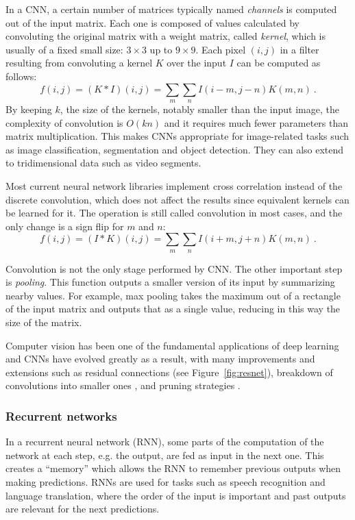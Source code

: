 In a CNN, a certain number of matrices typically named \textit{channels} is computed out of the input matrix. Each one is composed of values calculated by convoluting the original matrix with a weight matrix, called \textit{kernel}, which is usually of a fixed small size: $3\times 3$ up to $9\times 9$. Each pixel $(i, j)$ in a filter resulting from convoluting a kernel $K$ over the input $I$ can be computed as follows:
\begin{equation}
    f(i,j)=\left(K\ast I\right)(i,j)=\sum_{m}\sum_{n}I(i-m,j-n)K(m,n)~.
\end{equation}
By keeping $k$, the size of the kernels, notably smaller than the input image, the complexity of convolution is $O(kn)$ and it requires much fewer parameters than matrix multiplication.  This makes CNNs appropriate for image-related tasks such as image classification, segmentation and object detection. They can also extend to tridimensional data such as video segments.


Most current neural network libraries implement cross correlation instead of the discrete convolution, which does not affect the results since equivalent kernels can be learned for it. The operation is still called convolution in most cases, and the only change is a sign flip for $m$ and $n$:
\begin{equation}
    f(i,j)=\left(I\ast K\right)(i,j)=\sum_{m}\sum_{n}I(i+m,j+n)K(m,n)~.
\end{equation}

Convolution is not the only stage performed by CNN. The other important step is \textit{pooling}. This function outputs a smaller version of its input by summarizing nearby values. For example, max pooling  takes the maximum out of a rectangle of the input matrix and outputs that as a single value, reducing in this way the size of the matrix.

Computer vision has been one of the fundamental applications of deep learning and CNNs have evolved greatly as a result, with many improvements and extensions such as residual connections (see Figure~\ref{fig:resnet}), breakdown of convolutions into smaller ones , and pruning strategies .


\subsubsection{Recurrent networks}

{In a recurrent neural network (RNN), some parts of the computation of the network at each step, e.g. the output, are fed as input in the next one. This creates a ``memory'' which allows the RNN to remember previous outputs when making predictions. RNNs are used for tasks such as speech recognition and language translation, where the order of the input is important and past outputs are relevant for the next predictions.}

